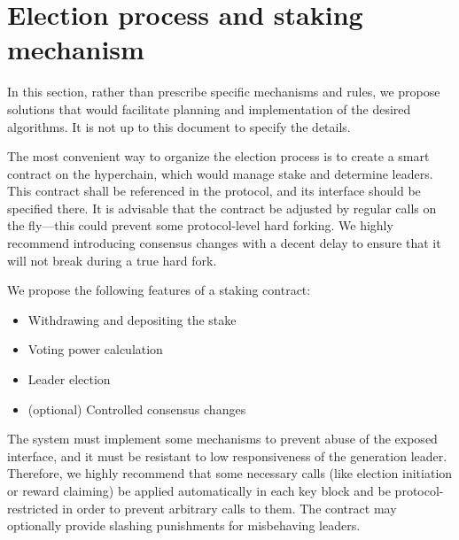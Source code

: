 \section{Election process and staking mechanism}

In this section, rather than prescribe specific mechanisms and rules, we propose
solutions that would facilitate planning and implementation of the desired
algorithms. It is not up to this document to specify the details.

The most convenient way to organize the election process is to create a smart
contract on the hyperchain, which would manage stake and determine leaders. This
contract shall be referenced in the protocol, and its interface should be
specified there. It is advisable that the contract be adjusted by regular calls
on the fly---this could prevent some protocol-level hard forking. We highly
recommend introducing consensus changes with a decent delay to ensure that it
will not break during a true hard fork.

We propose the following features of a staking contract:

\begin{itemize}
\item Withdrawing and depositing the stake
\item Voting power calculation
\item Leader election
\item (optional) Controlled consensus changes
\end{itemize}

The system must implement some mechanisms to prevent abuse of the exposed
interface, and it must be resistant to low responsiveness of the generation
leader. Therefore, we highly recommend that some necessary calls (like election
initiation or reward claiming) be applied automatically in each key block and be
protocol-restricted in order to prevent arbitrary calls to them. The contract
may optionally provide slashing punishments for misbehaving leaders.
